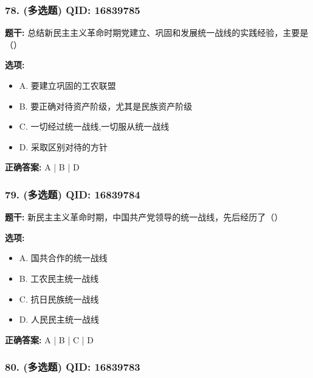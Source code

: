 \documentclass[12pt,UTF8]{ctexart}
\begin{document}
\subsubsection*{78. (多选题) \small QID: 16839785}

\textbf{题干:}
总结新民主主义革命时期党建立、巩固和发展统一战线的实践经验，主要是（）

\textbf{选项:}
\begin{itemize}[leftmargin=*]

  \item A. 要建立巩固的工农联盟

  \item B. 要正确对待资产阶级，尤其是民族资产阶级

  \item C. 一切经过统一战线,一切服从统一战线

  \item D. 采取区别对待的方针

\end{itemize}

\textbf{正确答案:}
A | B | D

\vspace{0.3em}\hrulefill\vspace{0.7em}

\subsubsection*{79. (多选题) \small QID: 16839784}

\textbf{题干:}
新民主主义革命时期，中国共产党领导的统一战线，先后经历了（）

\textbf{选项:}
\begin{itemize}[leftmargin=*]

  \item A. 国共合作的统一战线

  \item B. 工农民主统一战线

  \item C. 抗日民族统一战线

  \item D. 人民民主统一战线

\end{itemize}

\textbf{正确答案:}
A | B | C | D

\vspace{0.3em}\hrulefill\vspace{0.7em}

\subsubsection*{80. (多选题) \small QID: 16839783}
\end{document}
